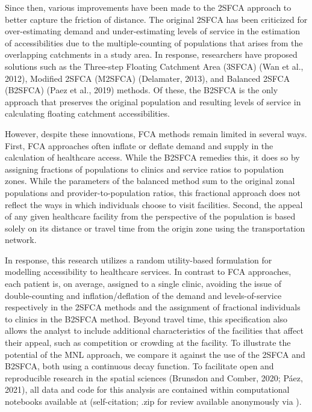 \documentclass[]{elsarticle} %
\begin{document}
Since then, various improvements have been made to the 2SFCA approach to
better capture the friction of distance. The original 2SFCA has been
criticized for over-estimating demand and under-estimating levels of
service in the estimation of accessibilities due to the
multiple-counting of populations that arises from the overlapping
catchments in a study area. In response, researchers have proposed
solutions such as the Three-step Floating Catchment Area (3SFCA) (Wan et
al., 2012), Modified 2SFCA (M2SFCA) (Delamater, 2013), and Balanced
2SFCA (B2SFCA) (Paez et al., 2019) methods. Of these, the B2SFCA is the
only approach that preserves the original population and resulting
levels of service in calculating floating catchment accessibilities.

However, despite these innovations, FCA methods remain limited in
several ways. First, FCA approaches often inflate or deflate demand and
supply in the calculation of healthcare access. While the B2SFCA
remedies this, it does so by assigning fractions of populations to
clinics and service ratios to population zones. While the parameters of
the balanced method sum to the original zonal populations and
provider-to-population ratios, this fractional approach does not reflect
the ways in which individuals choose to visit facilities. Second, the
appeal of any given healthcare facility from the perspective of the
population is based solely on its distance or travel time from the
origin zone using the transportation network.

In response, this research utilizes a random utility-based formulation
for modelling accessibility to healthcare services. In contrast to FCA
approaches, each patient is, on average, assigned to a single clinic,
avoiding the issue of double-counting and inflation/deflation of the
demand and levels-of-service respectively in the 2SFCA methods and the
assignment of fractional individuals to clinics in the B2SFCA method.
Beyond travel time, this specification also allows the analyst to
include additional characteristics of the facilities that affect their
appeal, such as competition or crowding at the facility. To illustrate
the potential of the MNL approach, we compare it against the use of the
2SFCA and B2SFCA, both using a continuous decay function. To facilitate
open and reproducible research in the spatial sciences (Brunsdon and
Comber, 2020; Páez, 2021), all data and code for this analysis are
contained within computational notebooks available at (self-citation;
.zip for review available anonymously via ).
\end{document}
